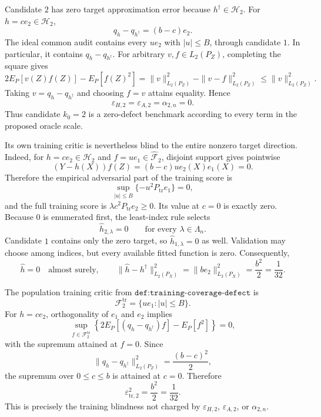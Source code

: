 Candidate \(2\) has zero target approximation error because \(h^\dagger\in\mathcal H_2\). For \(h=c e_2\in\mathcal H_2\),
\[
 q_h-q_{h^\dagger}=(b-c)e_2.
\]
The ideal common audit contains every \(u e_2\) with \(|u|\le B\), through candidate \(1\). In particular, it contains \(q_h-q_{h^\dagger}\). For arbitrary \(v,f\in L_2(P_Z)\), completing the square gives
\[
 2E_P[v(Z)f(Z)]-E_P[f(Z)^2]
 =\|v\|_{L_2(P_Z)}^2-\|v-f\|_{L_2(P_Z)}^2
 \le\|v\|_{L_2(P_Z)}^2.
\]
Taking \(v=q_h-q_{h^\dagger}\) and choosing \(f=v\) attains equality. Hence
\[
 \varepsilon_{H,2}=\varepsilon_{A,2}=\alpha_{2,n}=0.
\]
Thus candidate \(k_0=2\) is a zero-defect benchmark according to every term in the proposed oracle scale.

Its own training critic is nevertheless blind to the entire nonzero target direction. Indeed, for \(h=c e_2\in\mathcal H_2\) and \(f=u e_1\in\widehat{\mathcal F}_2\), disjoint support gives pointwise
\[
 (Y-h(X))f(Z)=(b-c)u e_2(X)e_1(X)=0.
\]
Therefore the empirical adversarial part of the training score is
\[
 \sup_{|u|\le B}\{-u^2P_{\mathrm{tr}}e_1\}=0,
\]
and the full training score is \(\lambda c^2P_{\mathrm{tr}}e_2\ge0\). Its value at \(c=0\) is exactly zero. Because \(0\) is enumerated first, the least-index rule selects
\[
 \widehat h_{2,\lambda}=0
 \qquad\text{for every }\lambda\in\Lambda_n.
\]
Candidate \(1\) contains only the zero target, so \(\widehat h_{1,\lambda}=0\) as well. Validation may choose among indices, but every available fitted function is zero. Consequently,
\[
 \widehat h=0\quad\text{almost surely},
 \qquad
 \|\widehat h-h^\dagger\|_{L_2(P_X)}^2
 =\|b e_2\|_{L_2(P_X)}^2
 =\frac{b^2}{2}
 =\frac1{32}.
\]

The population training critic from \(\texttt{def:training-coverage-defect}\) is
\[
 \mathcal F_2^{\mathrm{tr}}=\{u e_1:|u|\le B\}.
\]
For \(h=c e_2\), orthogonality of \(e_1\) and \(e_2\) implies
\[
 \sup_{f\in\mathcal F_2^{\mathrm{tr}}}
 \left\{2E_P[(q_h-q_{h^\dagger})f]-E_P[f^2]\right\}=0,
\]
with the supremum attained at \(f=0\). Since
\[
 \|q_h-q_{h^\dagger}\|_{L_2(P_Z)}^2=\frac{(b-c)^2}{2},
\]
the supremum over \(0\le c\le b\) is attained at \(c=0\). Therefore
\[
 \varepsilon_{\mathrm{tr},2}^2=\frac{b^2}{2}=\frac1{32}.
\]
This is precisely the training blindness not charged by \(\varepsilon_{H,2}\), \(\varepsilon_{A,2}\), or \(\alpha_{2,n}\).

